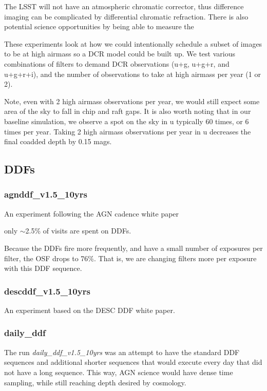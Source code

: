 The LSST will not have an atmospheric chromatic corrector, thus difference imaging can be complicated by differential chromatic refraction. There is also potential science opportunities by being able to measure the 

These experiments look at how we could intentionally schedule a subset of images to be at high airmass so a DCR model could be built up. We test various combinations of filters to demand DCR observations (u+g, u+g+r, and u+g+r+i), and the number of observations to take at high airmass per year (1 or 2). 

Note, even with 2 high airmass observations per year, we would still expect some area of the sky to fall in chip and raft gaps.  It is also worth noting that in our baseline simulation, we observe a spot on the sky in u typically 60 times, or 6 times per year. Taking 2 high airmass observations per year in u decreases the final coadded depth by 0.15 mags.

   
\subsection{DDFs}
\subsubsection{agnddf\_v1.5\_10yrs}

An experiment following the AGN cadence white paper

only $\sim$2.5\% of visits are spent on DDFs. 

Because the DDFs fire more frequently, and have a small number of exposures per filter, the OSF drops to 76\%. That is, we are changing filters more per exposure with this DDF sequence. 

\subsubsection{descddf\_v1.5\_10yrs}

An experiment based on the DESC DDF white paper.

\subsubsection{daily\_ddf}

The run \emph{daily\_ddf\_v1.5\_10yrs} was an attempt to have the standard DDF sequences and additional shorter sequences that would execute every day that did not have a long sequence.  This way, AGN science would have dense time sampling, while still reaching depth desired by cosmology.



